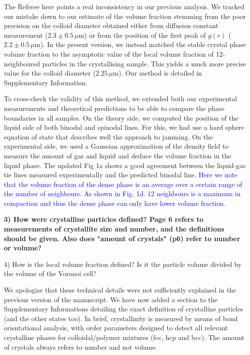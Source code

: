 \documentclass[11pt,a4paper]{article}
\newenvironment{referee}%
{\bigskip\singlespacing\bf}%
{\par\bigskip}
\begin{document}
The Referee here points a real inconsistency in our previous analysis. We tracked our mistake down to our estimate of the volume fraction stemming from the poor precision on the colloid diameter obtained either from diffusion constant measurement ($2.3\pm0.5\,\mu$m) or from the position of the first peak of $g(r)$ ($2.2\pm0.5\,\mu$m). In the present version, we instead matched the stable crystal phase volume fraction to the asymptotic value of the local volume fraction of 12-neighboured particles in the crystallising sample. This yields a much more precise value for the colloid diameter ($2.25\,\mu$m). Our method is detailed in Supplementary Information.

To cross-check the validity of this method, we extended both our experimental measurements and theoretical predictions to be able to compare the phase boundaries in all samples. On the theory side, we computed the position of the liquid side of both binodal and spinodal lines. For this, we had use a hard sphere equation of state that describes well the approach to jamming. On the experimental side, we used a Gaussian approximation of the density field to measure the amount of gas and liquid and deduce the volume fraction in the liquid phase. The updated Fig 1a shows a good agreement between the liquid-gas tie lines measured experimentally and the predicted binodal line. \textcolor{blue}{Here we note that the volume fraction of the dense phase is an average over a certain range of the number of neighbours. As shown in Fig. 1d. 12 neighbours is a maximum in compaction and thus the dense phase can only have lower volume fraction.} 

\begin{referee}
3) How were crystalline particles defined? Page 6 refers to measurements of crystallite size and number, and the definitions should be given. Also does "amount of crystals" (p6) refer to number or volume?

4) How is the local volume fraction defined? Is it the particle volume divided by the volume of the Voronoi cell?
\end{referee}

We apologize that these technical details were not sufficiently explained in the previous version of the manuscript.
We have now added a section to the Supplementary Informations detailing the exact definition of crystalline particles
(and the other states too). In brief, crystallinity is measured by means of bond orientational analysis, with order
parameters designed to detect all relevant crystalline phases for colloidal/polymer mixtures (fcc, hcp and bcc).
The amount of crystals always refers to number and not volume.
\end{document}
